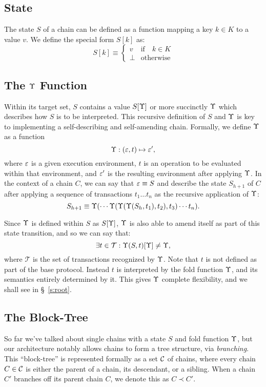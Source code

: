 \subsection{State}

The state $S$ of a chain can be defined as a function mapping a key $k \in K$ to a
value $v$. We define the special form $S[k]$ as:
\[
    S[k] \equiv \begin{cases}
        v                   & \text{if} \quad k \in K \\
        \bot                & \text{otherwise}
    \end{cases}
\]

\subsection{The $\Upsilon$ Function} \label{fold-function}

Within its target set, $S$ contains a value $S[\Upsilon]$ or more succinctly
$\Upsilon$ which describes how $S$ is to be interpreted. This recursive definition
of $S$ and $\Upsilon$ is key to implementing a self-describing and self-amending
chain. Formally, we define $\Upsilon$ as a function
\[
    \Upsilon : (\varepsilon, t) \mapsto \varepsilon',
\]
where $\varepsilon$ is a given execution environment, $t$ is an operation to be
evaluated within that environment, and $\varepsilon'$ is the resulting environment
after applying $\Upsilon$.  In the context of a chain $C$, we can say that $\varepsilon
\equiv S$ and describe the state $S_{h+1}$ of $C$ after applying a
sequence of transactions $t_1 \dots t_n$ as the recursive application of $\Upsilon$:
\[
    S_{h+1} \equiv \Upsilon(\cdots \Upsilon(\Upsilon(\Upsilon(S_h,
    t_1), t_2), t_3) \cdots t_n).
\]

Since $\Upsilon$ is defined within $S$ as $S[\Upsilon]$, $\Upsilon$ is also
able to amend itself as part of this state transition, and so we can say that:
\[
    \exists t \in \mathcal{T} : \Upsilon(S, t)[\Upsilon] \neq \Upsilon,
\]
where $\mathcal{T}$ is the set of transactions recognized by $\Upsilon$.  Note
that $t$ is not defined as part of the base protocol. Instead $t$ is
interpreted by the fold function $\Upsilon$, and its semantics entirely determined
by it. This gives $\Upsilon$ complete flexibility, and we shall see in
\S~\ref{s:root}.

\subsection{The Block-Tree}

So far we've talked about single chains with a state $S$ and fold function
$\Upsilon$, but our architecture notably allows chains to form a tree structure,
via \emph{branching}. This ``block-tree'' is represented formally as a set
$\mathcal{C}$ of chains, where every chain $C \in \mathcal{C}$ is either the parent of a
chain, its descendant, or a sibling. When a chain $C'$ branches off its parent
chain $C$, we denote this as $C \prec C'$.

